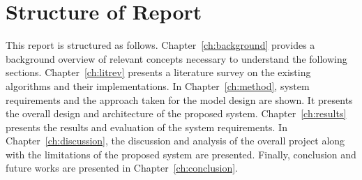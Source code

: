 \section{Structure of Report}
This report is structured as follows. Chapter~\ref{ch:background} provides a
background overview of relevant concepts necessary to understand the following
sections. Chapter~\ref{ch:litrev} presents a literature survey on the existing
algorithms and their implementations. In Chapter~\ref{ch:method}, system
requirements and the approach taken for the model design are shown. It presents
the overall design and architecture of the proposed system.
Chapter~\ref{ch:results} presents the results and evaluation of the system
requirements. In Chapter~\ref{ch:discussion}, the discussion and analysis of
the overall project along with the limitations of the proposed system are
presented. Finally, conclusion and future works are presented in
Chapter~\ref{ch:conclusion}.
